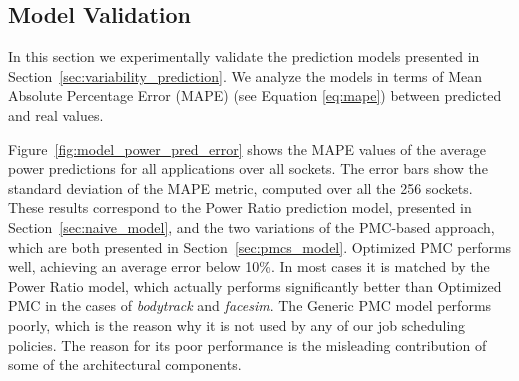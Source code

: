 \subsection{Model Validation}
\label{sec:model_validation}
In this section we experimentally validate the prediction models presented in Section~\ref{sec:variability_prediction}.  
We analyze the models in terms of Mean Absolute Percentage Error (MAPE) (see Equation \ref{eq:mape})  between predicted and real values.

Figure~\ref{fig:model_power_pred_error} shows the MAPE values of the average power predictions for all applications over all sockets.  
The error bars show the standard deviation of the MAPE metric, computed over all the 256 sockets.
These results correspond to the Power Ratio prediction model, presented 
in Section~\ref{sec:naive_model}, and the two variations of the PMC-based approach, which are both presented in Section~\ref{sec:pmcs_model}.
Optimized PMC performs well, achieving an average error below 10\%.
In most cases it is
matched by the Power Ratio model, which actually performs significantly better than Optimized PMC in the cases of \textit{bodytrack} and \textit{facesim}.
The Generic PMC model performs poorly, which is the reason why it is not used by any of our job scheduling policies.
The reason for its poor performance is the misleading contribution of some of the architectural components.

